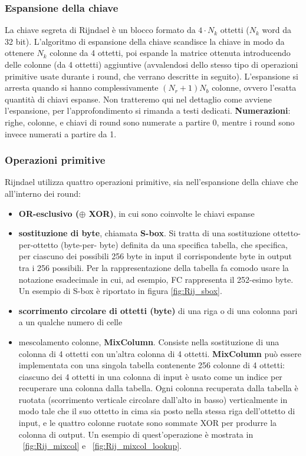 \subsubsection{Espansione della chiave}
La chiave segreta di Rijndael è un blocco formato da $4 \cdot N_{k}$ ottetti ($N_{k}$ word da 32 bit). L'algoritmo di espansione della chiave scandisce la chiave in modo da ottenere $N_{k}$ colonne da 4 ottetti, poi espande la matrice ottenuta introducendo delle colonne (da 4 ottetti) aggiuntive (avvalendosi dello stesso tipo di operazioni primitive usate durante i round, che verrano descritte in seguito). L'espansione si arresta quando si hanno complessivamente $(N_{r} + 1)N_{b}$ colonne, ovvero l'esatta quantità di chiavi espanse. Non tratteremo qui nel dettaglio come avviene l'espansione, per l'approfondimento si rimanda a testi dedicati.
\newline \newline
\textbf{Numerazioni}: righe, colonne, e chiavi di round sono numerate a
partire 0, mentre i round sono invece numerati a partire da 1.

\subsubsection{Operazioni primitive}
Rijndael utilizza quattro operazioni primitive, sia nell'espansione della chiave che all'interno dei round:
\begin{itemize}
  \item \textbf{OR-esclusivo ($\oplus$ XOR)}, in cui sono coinvolte le chiavi espanse
  \item \textbf{sostituzione di byte}, chiamata \textbf{S-box}. Si tratta di una sostituzione ottetto-per-ottetto (byte-per- byte) definita da una specifica tabella, che specifica, per ciascuno dei possibili 256 byte in input il corrispondente byte in output tra i 256 possibili. Per la rappresentazione della tabella fa comodo usare la notazione esadecimale in cui, ad esempio, FC rappresenta il 252-esimo byte. Un esempio di S-box è riportato in figura \ref{fig:Rij_sbox}.
  \item \textbf{scorrimento circolare di ottetti (byte)} di una riga o di una colonna pari a un qualche numero di celle
  \item mescolamento colonne, \textbf{MixColumn}. Consiste nella sostituzione di una colonna di 4 ottetti con un'altra colonna di 4 ottetti. \textbf{MixColumn} può essere implementata con una singola tabella contenente 256 colonne di 4 ottetti: ciascuno dei 4 ottetti in una colonna di input è usato come un indice per recuperare una colonna dalla tabella. Ogni colonna recuperata dalla tabella è ruotata (scorrimento verticale circolare dall'alto in basso) verticalmente in modo tale che il suo ottetto in cima sia posto nella stessa riga dell’ottetto di input, e le quattro colonne ruotate sono sommate XOR per produrre la colonna di output. Un esempio di quest'operazione è mostrata in \figurename ~\ref{fig:Rij_mixcol} e \figurename ~\ref{fig:Rij_mixcol_lookup}.
\end{itemize}

